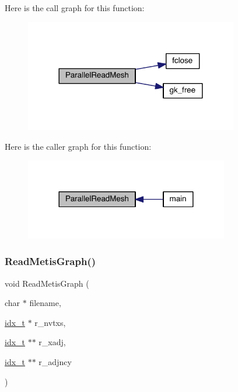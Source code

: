Here is the call graph for this function\+:\nopagebreak
\begin{figure}[H]
\begin{center}
\leavevmode
\includegraphics[width=264pt]{a00861_a2c53ca97c8a99924f3bbaa8fbd050b8c_cgraph}
\end{center}
\end{figure}
Here is the caller graph for this function\+:\nopagebreak
\begin{figure}[H]
\begin{center}
\leavevmode
\includegraphics[width=252pt]{a00861_a2c53ca97c8a99924f3bbaa8fbd050b8c_icgraph}
\end{center}
\end{figure}
\mbox{\label{a00861_a4ff02bbc05033b431cc3b60bc2f2a1a4}} 
\subsubsection{\texorpdfstring{Read\+Metis\+Graph()}{ReadMetisGraph()}}
{\footnotesize\ttfamily void Read\+Metis\+Graph (\begin{DoxyParamCaption}\item[{char $\ast$}]{filename,  }\item[{\hyperlink{a00876_aaa5262be3e700770163401acb0150f52}{idx\+\_\+t} $\ast$}]{r\+\_\+nvtxs,  }\item[{\hyperlink{a00876_aaa5262be3e700770163401acb0150f52}{idx\+\_\+t} $\ast$$\ast$}]{r\+\_\+xadj,  }\item[{\hyperlink{a00876_aaa5262be3e700770163401acb0150f52}{idx\+\_\+t} $\ast$$\ast$}]{r\+\_\+adjncy }\end{DoxyParamCaption})}

